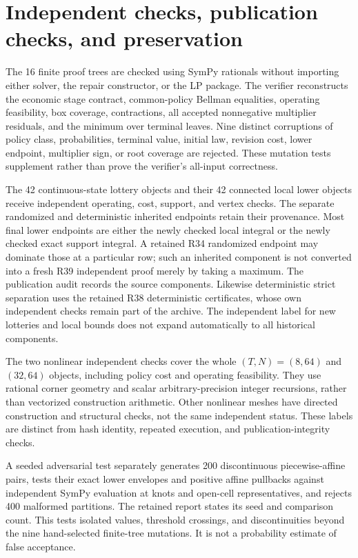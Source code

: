 \section{Independent checks, publication checks, and preservation}
The 16 finite proof trees are checked using SymPy rationals without importing either solver, the repair constructor, or the LP package. The verifier reconstructs the economic stage contract, common-policy Bellman equalities, operating feasibility, box coverage, contractions, all accepted nonnegative multiplier residuals, and the minimum over terminal leaves. Nine distinct corruptions of policy class, probabilities, terminal value, initial law, revision cost, lower endpoint, multiplier sign, or root coverage are rejected. These mutation tests supplement rather than prove the verifier's all-input correctness.

The 42 continuous-state lottery objects and their 42 connected local lower objects receive independent operating, cost, support, and vertex checks. The separate randomized and deterministic inherited endpoints retain their provenance. Most final lower endpoints are either the newly checked local integral or the newly checked exact support integral. A retained R34 randomized endpoint may dominate those at a particular row; such an inherited component is not converted into a fresh R39 independent proof merely by taking a maximum. The publication audit records the source components. Likewise deterministic strict separation uses the retained R38 deterministic certificates, whose own independent checks remain part of the archive. The independent label for new lotteries and local bounds does not expand automatically to all historical components.

The two nonlinear independent checks cover the whole $(T,N)=(8,64)$ and $(32,64)$ objects, including policy cost and operating feasibility. They use rational corner geometry and scalar arbitrary-precision integer recursions, rather than vectorized construction arithmetic. Other nonlinear meshes have directed construction and structural checks, not the same independent status. These labels are distinct from hash identity, repeated execution, and publication-integrity checks.

A seeded adversarial test separately generates 200 discontinuous piecewise-affine pairs, tests their exact lower envelopes and positive affine pullbacks against independent SymPy evaluation at knots and open-cell representatives, and rejects 400 malformed partitions. The retained report states its seed and comparison count. This tests isolated values, threshold crossings, and discontinuities beyond the nine hand-selected finite-tree mutations. It is not a probability estimate of false acceptance.

